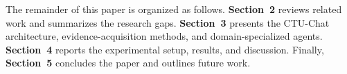 

The remainder of this paper is organized as follows. \textbf{Section~2} reviews related work and summarizes the research gaps. \textbf{Section~3} presents the CTU-Chat architecture, evidence-acquisition methods, and domain-specialized agents. \textbf{Section~4} reports the experimental setup, results, and discussion. Finally, \textbf{Section~5} concludes the paper and outlines future work.

